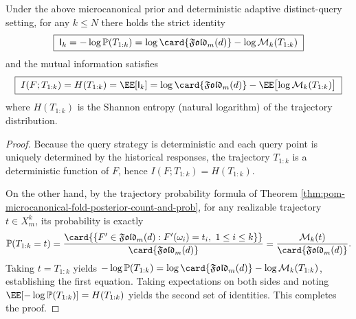 \begin{theorem}\label{thm:pom-microcanonical-information-identity}
Under the above microcanonical prior and deterministic adaptive distinct-query setting, for any \(k\le N\) there holds the strict identity
\[
\boxed{\;
\mathsf{I}_k
=-\log\mathbb{P}(T_{1:k})
=\log\card{\mathfrak{Fold}_m(d)}-\log \mathcal{M}_k(T_{1:k})\;}
\]
and the mutual information satisfies
\[
\boxed{\;
I(F;T_{1:k})=H(T_{1:k})
=\EE[\mathsf{I}_k]
=\log\card{\mathfrak{Fold}_m(d)}-\EE\bigl[\log \mathcal{M}_k(T_{1:k})\bigr]\;}
\]
where \(H(T_{1:k})\) is the Shannon entropy (natural logarithm) of the trajectory distribution.
\end{theorem}
\begin{proof}
Because the query strategy is deterministic and each query point is uniquely determined by the historical responses, the trajectory \(T_{1:k}\) is a deterministic function of \(F\), hence \(I(F;T_{1:k})=H(T_{1:k})\).
\par
On the other hand, by the trajectory probability formula of Theorem \ref{thm:pom-microcanonical-fold-posterior-count-and-prob},
for any realizable trajectory \(t\in X_m^k\), its probability is exactly
\[
\mathbb{P}(T_{1:k}=t)=\frac{\card{\{F'\in\mathfrak{Fold}_m(d):F'(\omega_i)=t_i,\ 1\le i\le k\}}}{\card{\mathfrak{Fold}_m(d)}}
=\frac{\mathcal{M}_k(t)}{\card{\mathfrak{Fold}_m(d)}}.
\]
Taking \(t=T_{1:k}\) yields
\(
-\log\mathbb{P}(T_{1:k})
=\log\card{\mathfrak{Fold}_m(d)}-\log\mathcal{M}_k(T_{1:k})
\), establishing the first equation.
Taking expectations on both sides and noting \(\EE[-\log\mathbb{P}(T_{1:k})]=H(T_{1:k})\) yields the second set of identities. This completes the proof.
\end{proof}

